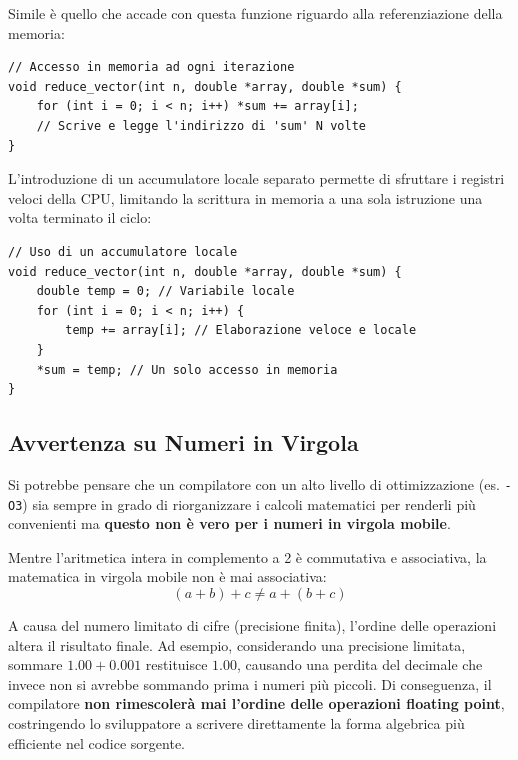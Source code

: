 Simile è quello che accade con questa funzione riguardo alla referenziazione della memoria:
\begin{framed}
\footnotesize
\begin{verbatim}
// Accesso in memoria ad ogni iterazione
void reduce_vector(int n, double *array, double *sum) {
    for (int i = 0; i < n; i++) *sum += array[i]; 
    // Scrive e legge l'indirizzo di 'sum' N volte
}
\end{verbatim}
\end{framed}
L'introduzione di un accumulatore locale separato permette di sfruttare i registri veloci della CPU, limitando la scrittura in memoria a una sola istruzione una volta terminato il ciclo:
\begin{framed}
\footnotesize
\begin{verbatim}
// Uso di un accumulatore locale 
void reduce_vector(int n, double *array, double *sum) {
    double temp = 0; // Variabile locale
    for (int i = 0; i < n; i++) {
        temp += array[i]; // Elaborazione veloce e locale
    }
    *sum = temp; // Un solo accesso in memoria 
}
\end{verbatim}
\end{framed}
\subsection{Avvertenza su Numeri in Virgola}
Si potrebbe pensare che un compilatore con un alto livello di ottimizzazione (es. \texttt{-O3}) sia sempre in grado di riorganizzare i calcoli matematici per renderli più convenienti ma \textbf{questo non è vero per i numeri in virgola mobile}.

Mentre l'aritmetica intera in complemento a 2 è commutativa e associativa, la matematica in virgola mobile non è mai associativa:
\begin{equation}
    (a+b)+c \neq a+(b+c)
\end{equation}

A causa del numero limitato di cifre (precisione finita), l'ordine delle operazioni altera il risultato finale. Ad esempio, considerando una precisione limitata, sommare $1.00 + 0.001$ restituisce $1.00$, causando una perdita del decimale che invece non si avrebbe sommando prima i numeri più piccoli. Di conseguenza, il compilatore \textbf{non rimescolerà mai l'ordine delle operazioni floating point}, costringendo lo sviluppatore a scrivere direttamente la forma algebrica più efficiente nel codice sorgente.


